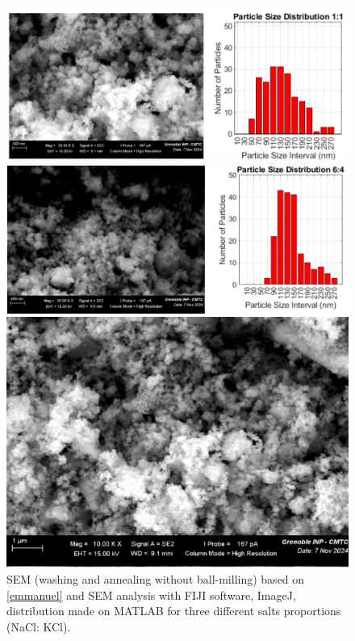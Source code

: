 \documentclass{article}
\begin{document}
      \begin{figure}[H]
        \centering
        \begin{minipage}{0.8\textwidth}
          \centering
          \includegraphics[width=\textwidth]{oneone.png}
          
        \end{minipage}
        \vfill
        \begin{minipage}{0.8\textwidth}
          \centering
          \includegraphics[width=\textwidth]{sixfour.png}
          
        \end{minipage}
        \vfill
        \begin{minipage}{0.8\textwidth}
          \centering
          \includegraphics[width=\textwidth]{foursix.png}
          
        \end{minipage}
        \caption{ SEM (washing and annealing without ball-milling) based on \ref{emmanuel} and SEM analysis with FIJI software, ImageJ, distribution made on MATLAB for three different salts proportions (NaCl: KCl).}
\label{distributions}
      \end{figure}
\end{document}
